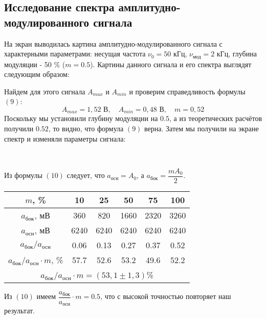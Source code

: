 \documentclass[a4paper,11pt]{extarticle}
\begin{document}
\subsection*{Исследование спектра амплитудно-модулированного сигнала}
На экран выводилась картина амплитудно-модулированного сигнала с характерными параметрами: несущая частота $\nu_0 = 50$ кГц, $\nu_{\text{мод}} = 2$ кГц, глубина модуляции - 50 \% ($m = 0.5$). Картины данного сигнала и его спектра выглядят следующим образом:
\begin{figure}[H]
\centering
\end{figure}
\n
Найдем для этого сигнала $A_{max}$ и $A_{min}$ и проверим справедливость формулы $(9)$:
\[A_{max} = 1,52 \text{ В}, \quad A_{min} = 0,48 \text{ В}, \quad m = 0,52\]
\n
Поскольку мы установили глубину модуляции на $0.5$, а из теоретических расчётов получили $0.52$, то видно, что формула $(9)$ верна.
\n\n
Затем мы получили на экране спектр и изменяли параметры сигнала:
\begin{figure}[H]
    \centering
    \\
    \end{figure}
    \begin{figure}[H]
    \centering
        			
\end{figure}\n
Из формулы $(10)$ следует, что $a_{\text{осн}} = A_0$, а $a_{\text{бок}} = \dfrac{mA_0}{2}$.
\begin{center}
\begin{tabular}{|c|c|c|c|c|c|}
\hline
$m$, \% & 10 & 25 & 50 & 75 & 100 \\ \hline
$a_{\text{бок}}$, мВ & 360 & 820 & 1660 & 2320 & 3260 \\ \hline
$a_{\text{осн}}$, мВ & 6240 & 6240 & 6240 & 6240 & 6240 \\ \hline
$a_{\text{бок}}/a_{\text{осн}}$ & 0.06 & 0.13 & 0.27 & 0.37 & 0.52 \\ \hline
$a_{\text{бок}}/a_{\text{осн}} \cdot m$, \% & 57.7 & 52.6 & 53.2 & 49.6 & 52.2 \\ \hline
\multicolumn{6}{|c|}{$a_{\text{бок}}/a_{\text{осн}} \cdot m = (53,1 \pm 1,3)$\%} \\ \hline
\end{tabular}
\end{center}
Из $(10)$ имеем $\dfrac{a_{\text{бок}}}{a_{\text{осн}}} \cdot m = 0.5$, что с высокой точностью повторяет наш результат.
\n
\end{document}
